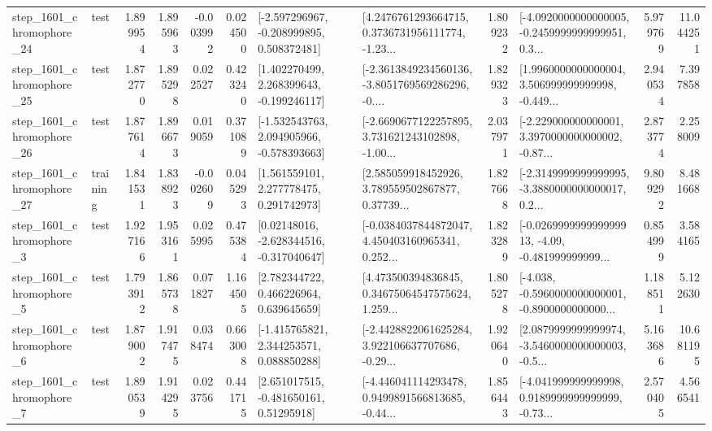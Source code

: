 \begin{tabular}{llrrrrllrlrr}
 step\_1601\_chromophore\_24 &      test &      1.899954 &    1.895963 &     -0.003992 &  0.024500 &   [-2.597296967, -0.208999895, 0.508372481] &  [4.2476761293664715, 0.3736731956111774, -1.23... &       1.809232 &  [-4.0920000000000005, -0.2459999999999951, 0.3... &            5.979769 &         11.044251 \\
 step\_1601\_chromophore\_25 &      test &      1.872770 &    1.895298 &      0.022527 &  0.423240 &    [1.402270499, 2.268399643, -0.199246117] &  [-2.3613849234560136, -3.8051769569286296, -0.... &       1.829323 &  [1.9960000000000004, 3.506999999999998, -0.449... &            2.940534 &          7.397858 \\
 step\_1601\_chromophore\_26 &      test &      1.877614 &    1.896673 &      0.019059 &  0.371089 &   [-1.532543763, 2.094905966, -0.578393663] &  [-2.6690677122257895, 3.731621243102898, -1.00... &       2.037971 &  [-2.229000000000001, 3.3970000000000002, -0.87... &            2.873774 &          2.258009 \\
 step\_1601\_chromophore\_27 &  training &      1.841531 &    1.838923 &     -0.002609 &  0.045293 &     [1.561559101, 2.277778475, 0.291742973] &  [2.585059918452926, 3.789559502867877, 0.37739... &       1.827668 &  [-2.3149999999999995, -3.3880000000000017, 0.2... &            9.809292 &          8.481668 \\
  step\_1601\_chromophore\_3 &      test &      1.927166 &    1.953161 &      0.025995 &  0.475384 &    [0.02148016, -2.628344516, -0.317040647] &  [-0.0384037844872047, 4.450403160965341, 0.252... &       1.823289 &  [-0.026999999999999913, -4.09, -0.481999999999... &            0.854999 &          3.584165 \\
  step\_1601\_chromophore\_5 &      test &      1.793912 &    1.865738 &      0.071827 &  1.164505 &     [2.782344722, 0.466226964, 0.639645659] &  [4.473500394836845, 0.34675064547575624, 1.259... &       1.805278 &  [-4.038, -0.5960000000000001, -0.8900000000000... &            1.188511 &          5.122630 \\
  step\_1601\_chromophore\_6 &      test &      1.879002 &    1.917475 &      0.038474 &  0.663008 &    [-1.415765821, 2.344253571, 0.088850288] &  [-2.4428822061625284, 3.922106637707686, -0.29... &       1.920640 &  [2.0879999999999974, -3.5460000000000003, -0.5... &            5.163686 &         10.681195 \\
  step\_1601\_chromophore\_7 &      test &      1.890539 &    1.914295 &      0.023756 &  0.441715 &     [2.651017515, -0.481650161, 0.51295918] &  [-4.446041114293478, 0.9499891566813685, -0.44... &       1.856443 &  [-4.041999999999998, 0.9189999999999999, -0.73... &            2.570405 &          4.566541 \\

\end{tabular}
